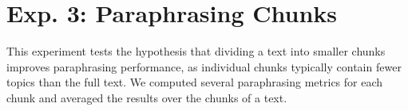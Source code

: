 \section{Exp. 3: Paraphrasing Chunks}
\label{sec:results_chunks}

This experiment tests the hypothesis that dividing a text into smaller chunks improves paraphrasing performance, as individual chunks typically contain fewer topics than the full text. 
We computed several paraphrasing metrics for each chunk and averaged the results over the chunks of a text.

\begin{table}[h]
\centering
\caption[Impact of the number of chunks on paraphrase measures.]{Impact of the number of chunks on syntactic and semantic paraphrase measures. 
Impact is reported as the absolute change between a single-chunk paraphrase and the maximum number of chunks. 
Bold values indicate the largest observed changes. 
Ideally, syntactic measures should be minimized, while semantic measures are maximized.}
\label{tab:impact_chunks_dataset_paraphraser}
\end{table}

